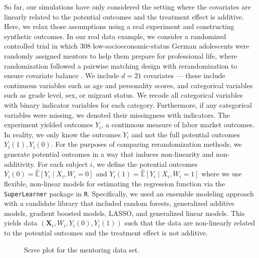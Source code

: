 \documentclass[11pt,twoside]{article}
\theoremstyle{definition}
\theoremstyle{remark}
\begin{document}
So far, our simulations have only considered the setting where the covariates are linearly related to the potential outcomes and the treatment effect is additive. Here, we relax those assumptions using a real experiment and constructing synthetic outcomes. In our real data example, we consider a randomized controlled trial in which 308 low-socioeconomic-status German adolescents were randomly assigned mentors to help them prepare for professional life, where randomization followed a pairwise matching design with rerandomization to ensure covariate balance \citep{mentoringpaper}. We include $d=21$ covariates --- these include continuous variables such as age and personality scores, and categorical variables such as grade level, sex, or migrant status. We recode all categorical variables with binary indicator variables for each category. Furthermore, if any categorical variables were missing, we denoted their missingness with indicators. The experiment yielded outcomes $Y_i$, a continuous measure of labor market outcomes. In reality, we only know the outcomes $Y_i$ and not the full potential outcomes $Y_i(1), Y_i(0)$. For the purposes of comparing rerandomization methods, we generate potential outcomes in a way that induces non-linearity and non-additivity. For each subject $i$, we define the potential outcomes $Y_i(0) = \widehat{\mathbb{E}}\left[Y_i \mid X_i, W_i = 0\right]$ and $Y_i(1) = \widehat{\mathbb{E}}\left[Y_i \mid X_i, W_i = 1\right]$ where we use flexible, non-linear models for estimating the regression function via the \texttt{SuperLearner} package in \texttt{R}. Specifically, we used an ensemble modeling approach with a candidate library that included random forests, generalized additive models, gradient boosted models, LASSO, and generalized linear models. This yields data $(\mathbf{X}_i, W_i, Y_i(0), Y_i(1))$ such that the data are non-linearly related to the potential outcomes and the treatment effect is not additive. 

\begin{figure}[h]
    \centering
{}
    \caption{Scree plot for the mentoring data set.}
    \label{scree_plot_mentoring}
\end{figure}
\end{document}
